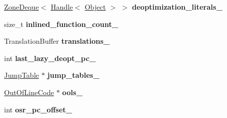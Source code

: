 \begin{DoxyCompactItemize}
\item 
\hyperlink{classv8_1_1internal_1_1_zone_deque}{Zone\+Deque}$<$ \hyperlink{classv8_1_1internal_1_1_handle}{Handle}$<$ \hyperlink{classv8_1_1internal_1_1_object}{Object} $>$ $>$ {\bfseries deoptimization\+\_\+literals\+\_\+}\hypertarget{classv8_1_1internal_1_1compiler_1_1_code_generator_ad68416d48159a143360a0cd961e03317}{}\label{classv8_1_1internal_1_1compiler_1_1_code_generator_ad68416d48159a143360a0cd961e03317}

\item 
size\+\_\+t {\bfseries inlined\+\_\+function\+\_\+count\+\_\+}\hypertarget{classv8_1_1internal_1_1compiler_1_1_code_generator_aebbf84f42c8972bff56918cb326f8965}{}\label{classv8_1_1internal_1_1compiler_1_1_code_generator_aebbf84f42c8972bff56918cb326f8965}

\item 
Translation\+Buffer {\bfseries translations\+\_\+}\hypertarget{classv8_1_1internal_1_1compiler_1_1_code_generator_a203adb52c3034f16dfcf61973904012f}{}\label{classv8_1_1internal_1_1compiler_1_1_code_generator_a203adb52c3034f16dfcf61973904012f}

\item 
int {\bfseries last\+\_\+lazy\+\_\+deopt\+\_\+pc\+\_\+}\hypertarget{classv8_1_1internal_1_1compiler_1_1_code_generator_a15299503c6ec07ea6b2b4796a4da5ef8}{}\label{classv8_1_1internal_1_1compiler_1_1_code_generator_a15299503c6ec07ea6b2b4796a4da5ef8}

\item 
\hyperlink{classv8_1_1internal_1_1compiler_1_1_code_generator_1_1_jump_table}{Jump\+Table} $\ast$ {\bfseries jump\+\_\+tables\+\_\+}\hypertarget{classv8_1_1internal_1_1compiler_1_1_code_generator_ab9851a1c4085fc1dc1552733d0890a4b}{}\label{classv8_1_1internal_1_1compiler_1_1_code_generator_ab9851a1c4085fc1dc1552733d0890a4b}

\item 
\hyperlink{classv8_1_1internal_1_1compiler_1_1_out_of_line_code}{Out\+Of\+Line\+Code} $\ast$ {\bfseries ools\+\_\+}\hypertarget{classv8_1_1internal_1_1compiler_1_1_code_generator_ad0a94fde2fb52c5261e263d6031fa5f8}{}\label{classv8_1_1internal_1_1compiler_1_1_code_generator_ad0a94fde2fb52c5261e263d6031fa5f8}

\item 
int {\bfseries osr\+\_\+pc\+\_\+offset\+\_\+}\hypertarget{classv8_1_1internal_1_1compiler_1_1_code_generator_a939c32ccf9480d9777ad9df3a7793f63}{}\label{classv8_1_1internal_1_1compiler_1_1_code_generator_a939c32ccf9480d9777ad9df3a7793f63}

\end{DoxyCompactItemize}
